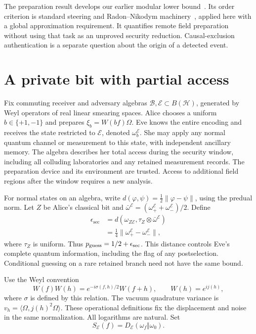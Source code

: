 \documentclass[11pt,a4paper]{article}
\newcommand{\HH}{\mathcal H}
\newcommand{\norm}[1]{\lVert #1\rVert}
\newcommand{\E}{\mathcal E}
\newcommand{\B}{\mathcal B}
\newcommand{\ssec}{\epsilon_{\mathrm{sec}}}
\begin{document}
The preparation result develops our earlier modular lower
bound~\cite{blanco2026modular}. Its order criterion is standard steering
and Radon--Nikodym machinery~\cite{hughston1993complete,raginsky2003radon},
applied here with a global approximation requirement. It quantifies remote
field preparation~\cite{ber2016remote} without using that task as an
unproved security reduction. Causal-exclusion authentication is a separate
question about the origin of a detected event.

\section{A private bit with partial access}
\label{sec:private}

Fix commuting receiver and adversary algebras $\B,\E\subset B(\HH)$,
generated by Weyl operators of real linear smearing spaces.
Alice chooses a uniform $b\in\{+1,-1\}$ and prepares
$\xi_b=W(bf)\Omega$. Eve knows the entire encoding and receives the state
restricted to $\E$, denoted $\omega_b^{\E}$. She may apply any normal
quantum channel or measurement to this state, with independent ancillary
memory. The algebra describes her total access during the security window,
including all colluding laboratories and any retained measurement records.
The preparation device and its environment are trusted. Access to additional
field regions after the window requires a new analysis.

For normal states on an algebra, write
$d(\varphi,\psi)=\frac12\norm{\varphi-\psi}$, using the predual norm.
Let $Z$ be Alice's classical bit and
$\bar\omega^{\E}=(\omega_+^{\E}+\omega_-^{\E})/2$. Define
\begin{equation}
\begin{split}
\ssec&=d(\omega_{Z\E},\tau_Z\otimes\bar\omega^{\E})\\
&=\tfrac14\norm{\omega_+^{\E}-\omega_-^{\E}},
\end{split}
\label{eq:secrecy}
\end{equation}
where $\tau_Z$ is uniform. Thus $p_{\rm guess}=1/2+\ssec$.
This distance controls Eve's complete quantum information, including the
flag of any postselection. Conditional guessing on a rare retained branch
need not have the same bound.

Use the Weyl convention
\begin{equation}
W(f)W(h)=e^{-i\sigma(f,h)/2}W(f+h),\qquad W(h)=e^{ij(h)},
\label{eq:weyl}
\end{equation}
where $\sigma$ is defined by this relation. The vacuum quadrature variance
is $v_h=\langle\Omega,j(h)^2\Omega\rangle$. These operational definitions
fix the displacement and noise in the same normalization. All logarithms
are natural. Set
\begin{equation}
S_{\E}(f)=D_{\E}(\omega_f\Vert\omega_0).
\end{equation}
\end{document}
